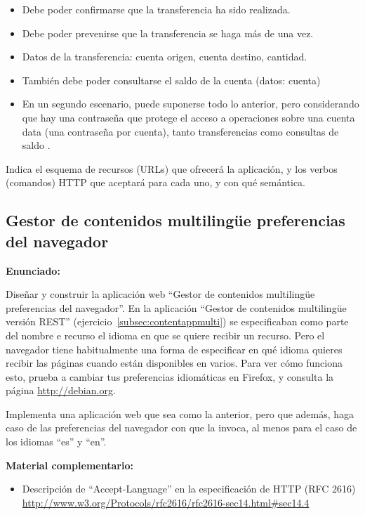 \begin{itemize}
\item Debe poder confirmarse que la transferencia ha sido realizada.
\item Debe poder prevenirse que la transferencia se haga más de una vez.
\item Datos de la transferencia: cuenta origen, cuenta destino, cantidad.
\item También debe poder consultarse el saldo de la cuenta (datos: cuenta)
\item En un segundo escenario, puede suponerse todo lo anterior, pero considerando que hay una contraseña que protege el acceso a operaciones sobre una cuenta data (una contraseña por cuenta), tanto transferencias como consultas de saldo
.
\end{itemize}

Indica el esquema de recursos (URLs) que ofrecerá la aplicación, y los verbos (comandos) HTTP que aceptará para cada uno, y con qué semántica.

\subsection{Gestor de contenidos multilingüe preferencias del navegador}
\label{subsec:contentappmulti-navegador}

\textbf{Enunciado:}

Diseñar y construir la aplicación web ``Gestor de contenidos multilingüe preferencias del navegador''. En la aplicación ``Gestor de contenidos multilingüe versión REST'' (ejercicio~\ref{subsec:contentappmulti}) se especificaban como parte del nombre e recurso el idioma en que se quiere recibir un recurso. Pero el navegador tiene habitualmente una forma de especificar en qué idioma quieres recibir las páginas cuando están disponibles en varios. Para ver cómo funciona esto, prueba a cambiar tus preferencias idiomáticas en Firefox, y consulta la página \url{http://debian.org}.

Implementa una aplicación web que sea como la anterior, pero que además, haga caso de las preferencias del navegador con que la invoca, al menos para el caso de los idiomas ``es'' y ``en''.

\textbf{Material complementario:}
\begin{itemize}
\item Descripción de ``Accept-Language'' en la especificación de HTTP (RFC 2616) \\
  \url{http://www.w3.org/Protocols/rfc2616/rfc2616-sec14.html#sec14.4}
\end{itemize}

